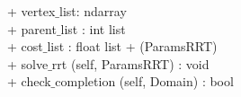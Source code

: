 {
+ vertex$\_$list: ndarray \\
+ parent$\_$list : int list \\
+ cost$\_$list : float list
}
{
+ \dunder (ParamsRRT) \\
+ solve$\_$rrt (self, ParamsRRT) : void \\
+ check$\_$completion (self, Domain) : bool
}